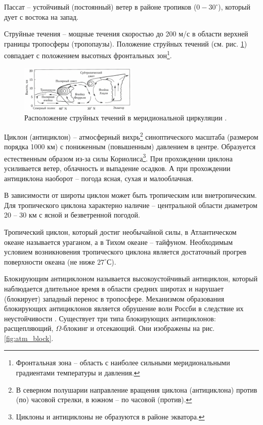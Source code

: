 Пассат -- устойчивый (постоянный) ветер в районе тропиков ($0-30^\circ$), который дует с востока на запад.

Струйные течения -- мощные течения скоростью до 200 м/с в области верхней границы тропосферы (тропопаузы). Положение струйных течений (см. рис. \ref{fig:atm_jets}) совпадает с положением высотных фронтальных зон\footnote{Фронтальная зона -- область с наиболее сильными меридиональными градиентами температуры и давления.}.

\begin{figure}[!ht]
\centering
\includegraphics[width=0.5\textwidth]{images/atm_jets.png}
\caption{Расположение струйных течений в меридиональной циркуляции \cite{Переведенцев-Мохов-2013}.}\label{fig:atm_jets}
\end{figure}

Циклон (антициклон) -- атмосферный вихрь\footnote{В северном полушарии направление вращения циклона (антициклона) против (по) часовой стрелки, в южном -- по часовой (против).} синоптического масштаба (размером порядка 1000 км) с пониженным (повышенным) давлением в центре.
Образуется естественным образом из-за силы Кориолиса\footnote{Циклоны и антициклоны не образуются в районе экватора.}.
При прохождении циклона усиливается ветер, облачность и выпадение осадков.
А при прохождении антициклона наоборот -- погода ясная, сухая и малооблачная.

В зависимости от широты циклон может быть тропическим или внетропическим.
Для тропического циклона характерно наличие  -- центральной области диаметром 20 -- 30 км с ясной и безветренной погодой.

Тропический циклон, который достиг необычайной силы, в Атлантическом океане называется ураганом, а в Тихом океане -- тайфуном.
Необходимым условием возникновения тропического циклона является достаточный прогрев поверхности океана (не ниже $27^\circ$С).

Блокирующим антициклоном называется высокоустойчивый антициклон, который наблюдается длительное время в области средних широтах и нарушает (блокирует) западный перенос в тропосфере.
Механизмом образования блокирующих антициклонов является обрушение волн Россби в следствие их неустойчивости \cite{Переведенцев-Мохов-2013}.
Существует три типа блокирующих антициклонов: расщепляющий, $\Omega$-блокинг и отсекающий.
Они изображены на рис. \ref{fig:atm_block}.

